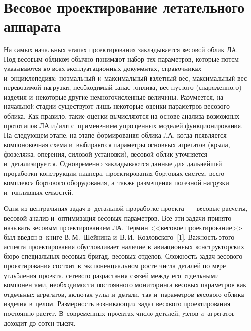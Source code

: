 \begin{multicols}{2}
  \begin{figure*} %
  \vspace*{1pt}
    \begin{center}  
  \mbox{%
 \epsfxsize=163mm 
 }
\end{center}
\vspace*{-10pt}
  \vspace*{-3pt}
  \end{figure*}
  
\vspace*{-6pt}
  
\section{Весовое проектирование летательного аппарата}

\vspace*{-2pt}

  На самых начальных этапах проектирования закладывается весовой облик 
ЛА. Под весовым обликом обычно понимают набор тех 
параметров, которые потом указываются во всех эксплуатационных 
документах, справочниках и~энциклопедиях: нормальный и~максимальный 
взлетный вес, максимальный вес перевозимой нагрузки, необходимый запас 
топлива, вес пустого (снаряженного) изделия и~некоторые другие 
немногочисленные величины. Разумеется, на начальной стадии существуют 
лишь некоторые оценки параметров весового облика. Как правило, такие 
оценки вы\-чис\-ля\-ют\-ся на основе анализа возможных прототипов ЛА и/или 
с~применением упрощенных моделей функционирования. На следующем 
этапе, на этапе формирования облика ЛА, когда появляется компоновочная 
схема и~выбираются па\-ра\-мет\-ры основных агрегатов (крыла, фюзеляжа, 
оперения, силовой установки), весовой облик уточняется и~детализируется. 
Одновременно закладываются данные для дальнейшей проработки 
конструкции планера, проектирования бортовых систем, всего комплекса 
бортового обору\-до\-ва\-ния, а~также размещения полезной нагрузки и~топливных 
емкостей.

 Одна из центральных задач в~детальной проработке проекта~--- 
весовые расчеты, весовой анализ и~оптимизация весовых параметров. 
Все эти задачи принято называть весовым проектированием 
ЛА. Термин <<весовое проектирование>> был введен в~книге 
В.\,М.~Шейнина и~В.\,И.~Козловского~[1]. Важность этого аспекта 
проектирования обуслов\-ли\-ва\-ет наличие в~авиационных конструкторских бюро 
специальных весовых бригад, весовых отделов. Сложность задач весового 
проектирования состоит в~экспоненциальном росте числа деталей по мере 
углубления проекта, сетевого разрастания связей между его отдельными 
компонентами, необходимости постоянного мониторинга весовых параметров 
как отдельных агрегатов, включая узлы и~детали, так и~параметров весового 
облика изделия в~целом. Размерность возникающих задач весового 
проектирования постоянно растет. В~современных проектах число деталей, 
узлов и~агрегатов доходит до сотен тысяч. 


\end{multicols}
